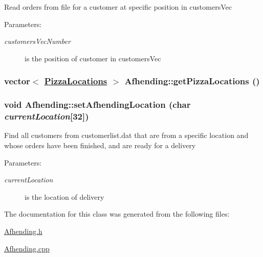 Read orders from file for a customer at specific position in customers\-Vec

\begin{Desc}
\item[Parameters:]
\begin{description}
\item[{\em customers\-Vec\-Number}]is the position of customer in customers\-Vec \end{description}
\end{Desc}
\hypertarget{class_afhending_3d38e7498fba59674c7d3838bf4c1824}{
\subsubsection[getPizzaLocations]{\setlength{\rightskip}{0pt plus 5cm}vector$<$ \hyperlink{class_pizza_locations}{Pizza\-Locations} $>$ Afhending::get\-Pizza\-Locations ()}}
\label{class_afhending_3d38e7498fba59674c7d3838bf4c1824}


\hypertarget{class_afhending_411cc45b50d4a59a33d76f6c54e52f78}{
\subsubsection[setAfhendingLocation]{\setlength{\rightskip}{0pt plus 5cm}void Afhending::set\-Afhending\-Location (char {\em current\-Location}\mbox{[}32\mbox{]})}}
\label{class_afhending_411cc45b50d4a59a33d76f6c54e52f78}


Find all customers from customerlist.dat that are from a specific location and whose orders have been finished, and are ready for a delivery

\begin{Desc}
\item[Parameters:]
\begin{description}
\item[{\em current\-Location}]is the location of delivery \end{description}
\end{Desc}


The documentation for this class was generated from the following files:\begin{CompactItemize}
\item 
\hyperlink{_afhending_8h}{Afhending.h}\item 
\hyperlink{_afhending_8cpp}{Afhending.cpp}\end{CompactItemize}
